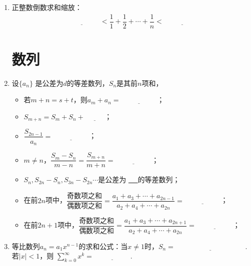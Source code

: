 \documentclass{article}
\newif\ifte
\begin{document}
\begin{multicols}{2}
\begin{enumerate}[leftmargin=20pt]
\item 正整数倒数求和缩放：
\begin{gather*}
    \underline{\ \ifte \ln(n+1)\else \hspace{2cm} \fi\ }
    <\dfrac{1}{1}+\dfrac{1}{2}+\cdots +\dfrac{1}{n}
    <\underline{\ \ifte 1+\ln n\else \hspace{2cm} \fi\ }
\end{gather*}

\section{数列}
\item 设$ \{a_n \} $ 是公差为$ d $的等差数列，$ S_n $是其前$ n $项和，
\begin{itemize}[leftmargin=-4pt]
\item 若$ m+n=s+t $，则$ a_m+a_n=\underline{\ \ifte 
    a_s+a_t\else \hspace{2cm} \fi\ } $；
\item $ S_{m+n}=S_m+S_n+\underline{\ \ifte mnd
    \else \hspace{1cm} \fi\ } $；
\item $ \dfrac{S_{2n-1}}{a_n}=\underline{\ \ifte 2n-1
    \else \hspace{2cm} \fi\ } $；
\item $ m\neq n $，$ \dfrac{S_m-S_n}{m-n}=\dfrac{S_{m+n}}{m+n}=
    \underline{\ \ifte \dfrac{d}{2}(m+n)+(a_1-\dfrac{d}{2})
    \else \hspace{2cm} \fi\ } $；
\item $ S_n,S_{2n}-S_n,S_{3n}-S_{2n} \cdots $是公差为
\underline{\ \ifte $ n^2d $\else \hspace{0.5cm} \fi\ }的等差数列；
\item 在前$ 2n $项中，$ \dfrac{\text{奇数项之和}}{\text{偶数项之和}}=
\dfrac{a_1+a_3+\cdots+a_{2n-1}}{a_2+a_4+\cdots+a_{2n}}=
\underline{\ \ifte \dfrac{a_n}{a_{n+1}} \else \hspace{2cm} \fi\ } $；
\item 在前$ 2n+1 $项中，$ \dfrac{\text{奇数项之和}}{\text{偶数项之和}}=
\dfrac{a_1+a_3+\cdots+a_{2n+1}}{a_2+a_4+\cdots+a_{2n}}=
\underline{\ \ifte \dfrac{n+1}{n} \else \hspace{2cm} \fi\ } $；
\end{itemize}

\item 等比数列$ a_n=a_1x^{n-1} $的求和公式：当$ x\neq 1 $时，$ S_n=
\underline{\ \ifte \dfrac{a_1(1-x^n)}{1-x}=\dfrac{a_1-a_{n+1}}{1-x}
    \else \hspace{4cm} \fi\ } $. 若$ |x|<1 $，则
$ \sum\limits_{k=0}^{\infty} x^{k}=\underline{\ \ifte 
    \dfrac{1}{1-x}\else \hspace{2cm} \fi\ } $.


\end{enumerate}
\end{multicols}
\end{document}
